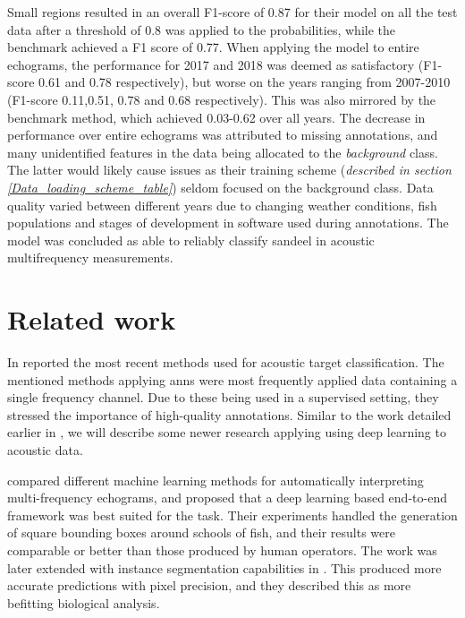    Small regions resulted in an overall F1-score of 0.87 for their model on all the test data after a threshold of 0.8 was applied to the probabilities, while the benchmark achieved a F1 score of 0.77. When applying the model to entire echograms, the performance for 2017 and 2018 was deemed as satisfactory (F1-score 0.61 and 0.78 respectively), but worse on the years ranging from 2007-2010 (F1-score 0.11,0.51, 0.78 and 0.68 respectively). This was also mirrored by the benchmark method, which achieved 0.03-0.62 over all years. The decrease in performance over entire echograms was attributed to missing annotations, and many unidentified features in the data being allocated to the \textit{background} class. The latter would likely cause issues as their training scheme (\textit{described in section \ref{Data_loading_scheme_table}}) seldom focused on the background class. Data quality varied between different years due to changing weather conditions, fish populations and stages of development in software used during annotations. The model was concluded as able to reliably classify sandeel in acoustic multifrequency measurements\cite{brautaset2020acoustic}.


\section{Related work} \label{related_work}
In \citeyear{korneliussen2018acoustic} \citet{korneliussen2018acoustic} reported the most recent methods used for acoustic target classification. The mentioned methods applying \gls{ann}s were most frequently applied data containing a single frequency channel. Due to these being used in a supervised setting, they stressed the importance of high-quality annotations. Similar to the work detailed earlier in \citet{brautaset2020acoustic}, we will describe some newer research applying using deep learning to acoustic data.
   
\citet{marques2021detecting} compared different machine learning methods for automatically interpreting multi-frequency echograms, and proposed that a deep learning based end-to-end framework was best suited for the task. Their experiments handled the generation of square bounding boxes around schools of fish, and their results were comparable or better than those produced by human operators. The work was later extended with instance segmentation capabilities in \citeyear{marques2021instance}\cite{marques2021instance}. This produced more accurate predictions with pixel precision, and they described this as more befitting biological analysis.
 
